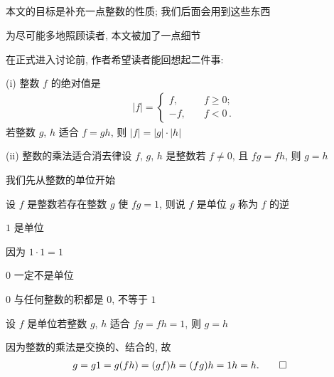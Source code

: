 \subsection*{\SomePropertiesOfIntegers}
\markright{\SomePropertiesOfIntegers}

本文的目标是补充一点整数的性质; 我们后面会用到这些东西\period

为尽可能多地照顾读者, 本文被加了一点细节\period

在正式进入讨论前, 作者希望读者能回想起二件事:

(i) 整数 $f$ 的绝对值是
\begin{align*}
    |f| = \begin{cases}
        f,  & \quad f \geq 0;     \\
        -f, & \quad f < 0 \period
    \end{cases}
\end{align*}
若整数 $g$, $h$ 适合 $f = gh$, 则 $|f| = |g| \cdot |h|$\period

(ii) 整数的乘法适合消去律\period 设 $f$, $g$, $h$ 是整数\period 若 $f \neq 0$, 且 $fg = fh$, 则 $g = h$\period

我们先从整数的单位开始\period

\begin{definition}
    设 $f$ 是整数\period 若存在整数 $g$ 使 $fg = 1$, 则说 $f$ 是单位 \period $g$ 称为 $f$ 的逆 \period
\end{definition}

\begin{proposition}
    $1$ 是单位\period
\end{proposition}

\begin{pf}
    因为 $1 \cdot 1 = 1$\period
\end{pf}

\begin{proposition}
    $0$ 一定不是单位\period
\end{proposition}

\begin{pf}
    $0$ 与任何整数的积都是 $0$, 不等于 $1$\period
\end{pf}

\begin{proposition}
    设 $f$ 是单位\period 若整数 $g$, $h$ 适合 $fg = fh = 1$, 则 $g = h$\period
\end{proposition}

\begin{pf}
    因为整数的乘法是交换的、结合的, 故
    \begin{align*}
         & g = g1 = g(fh) = (gf)h = (fg)h = 1h = h . \qedhere
    \end{align*}
\end{pf}


